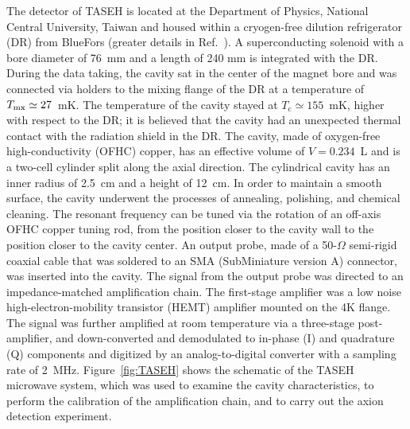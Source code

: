 \documentclass[%
 reprint,prl, %
superscriptaddress,
 amsmath,amssymb,
 aps,
]{revtex4-2}
\begin{document}
The detector of TASEH is located at the Department of Physics, National 
Central University, Taiwan and housed within a cryogen-free 
dilution refrigerator (DR) from BlueFors 
(greater details in Ref.~\cite{TASEHInstrumentation}). A 
superconducting solenoid with a 
bore diameter of 76~mm and a length of 240 mm is integrated with the DR. 
%
During the data taking, the cavity sat in the center of the magnet bore 
and was connected via holders to the mixing flange of the DR at a 
temperature of $T_{\rm mx}\simeq27$~mK. 
The temperature of the cavity stayed at $T_\text{c}\simeq155$~mK, higher 
with respect to the 
DR; it is believed that the cavity had an unexpected thermal contact with the 
radiation shield in the DR. 
The cavity, made of oxygen-free high-conductivity (OFHC) copper, has an 
effective volume of $V=0.234$~L and is a two-cell cylinder split along 
the axial direction. 
The cylindrical cavity has an inner radius of 2.5~cm and a 
height of 12~cm.  In order to maintain a smooth surface, the cavity underwent 
the processes of annealing, polishing, and chemical cleaning. 
The resonant frequency can be tuned via the rotation of an off-axis OFHC 
copper tuning rod, from the position closer to the cavity wall to the position 
closer to the cavity center. 
%
An output probe, made of a 50-$\Omega$ semi-rigid coaxial cable that was 
soldered to an SMA (SubMiniature version A) connector, was inserted into the 
cavity.  
The signal from the output probe was directed to an 
impedance-matched amplification chain. The first-stage amplifier was 
a low noise high-electron-mobility transistor (HEMT) amplifier 
mounted on the 4K flange. 
The signal was further amplified at room temperature via a 
three-stage post-amplifier, and down-converted 
and demodulated to in-phase (I) and quadrature (Q) components and digitized 
by an analog-to-digital converter with a sampling rate of 2~MHz. 
Figure~\ref{fig:TASEH} shows the schematic of the TASEH microwave system, 
which was used to examine the cavity characteristics, to perform the 
calibration of the amplification chain, and to carry out the axion 
detection experiment. 
\end{document}
